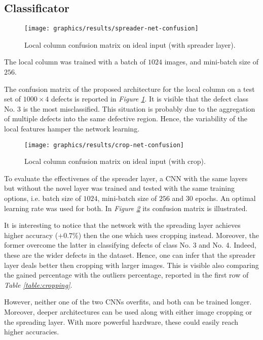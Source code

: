     \subsection{Classificator}\label{section:results:classificator}
    \begin{figure}
        \centering
        \texttt{[image: graphics/results/spreader-net-confusion]}
        \caption{Local column confusion matrix on ideal input (with spreader layer).}\label{fig:local-confusion-spreader}
    \end{figure}
    \par{
        The local column was trained with a batch of $1024$ images, and mini-batch size of $256$.
    }
    \par{
        The confusion matrix of the proposed architecture for the local column on a test set of $1000\times 4$ defects is reported in \emph{Figure \ref{fig:local-confusion-spreader}}. It is visible that the defect class No. 3 is the most misclassified. This situation is probably due to the aggregation of multiple defects into the same defective region. Hence, the variability of the local features hamper the network learning.
    }
    \begin{figure}
        \centering
        \texttt{[image: graphics/results/crop-net-confusion]}
        \caption{Local column confusion matrix on ideal input (with crop).}\label{fig:local-confusion-crop}
    \end{figure}
    \par{
        To evaluate the effectivenes of the spreader layer, a CNN with the same layers but without the novel layer was trained and tested with the same training options, i.e. batch size of $1024$, mini-batch size of $256$ and $30$ epochs. An optimal learning rate was used for both. In \emph{Figure \ref{fig:local-confusion-crop}} its confusion matrix is illustrated.
    }
    \par{
        It is interesting to notice that the network with the spreading layer achieves higher accuracy ($+0.7\%$) then the one which uses cropping instead. Moreover, the former overcome the latter in classifying defects of class No. 3 and No. 4. Indeed, these are the wider defects in the dataset. Hence, one can infer that the spreader layer deals better then cropping with larger images. This is visible also comparing the gained percentage with the outliers percentage, reported in the first row of \emph{Table \ref{table:cropping}}.
    }
    \par{
        However, neither one of the two CNNs overfits, and both can be trained longer. Moreover, deeper architectures can be used along with either image cropping or the spreading layer. With more powerful hardware, these could easily reach higher accuracies. 
    }
